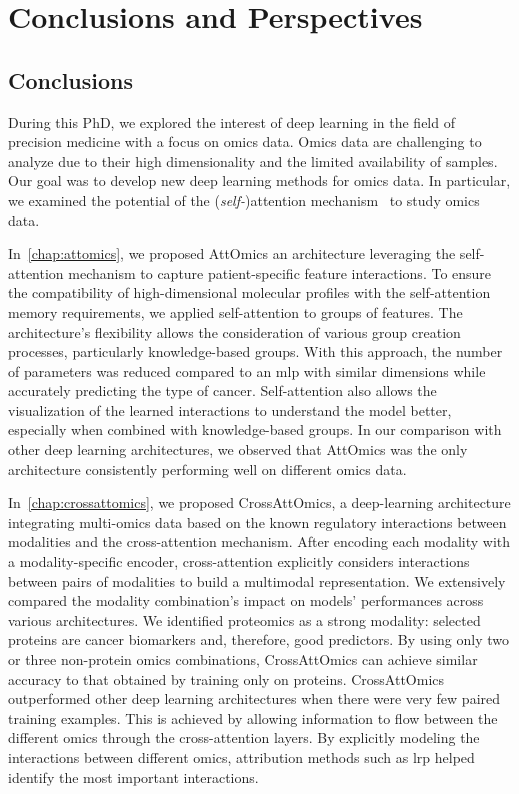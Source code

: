 \documentclass[../main.tex]{subfiles}
\begin{document}
\chapter{Conclusions and Perspectives}
\minitocpage
\section{Conclusions}
	During this PhD, we explored the interest of deep learning in the field of precision medicine with a focus on omics data.
	Omics data are challenging to analyze due to their high dimensionality and the limited availability of samples.
	Our goal was to develop new deep learning methods for omics data.
	In particular, we examined the potential of the (\emph{self-})attention mechanism~\cite{AttentionAllYouNeed} to study omics data.

	In~\cref{chap:attomics}, we proposed AttOmics an architecture leveraging the self-attention mechanism to capture patient-specific feature interactions.
	To ensure the compatibility of high-dimensional molecular profiles with the self-attention memory requirements, we applied self-attention to groups of features.
	The architecture's flexibility allows the consideration of various group creation processes, particularly knowledge-based groups.
	With this approach, the number of parameters was reduced compared to an \gls{mlp} with similar dimensions while accurately predicting the type of cancer.
	Self-attention also allows the visualization of the learned interactions to understand the model better, especially when combined with knowledge-based groups.
	In our comparison with other deep learning architectures, we observed that AttOmics was the only architecture consistently performing well on different omics data.

	In~\cref{chap:crossattomics}, we proposed CrossAttOmics, a deep-learning architecture integrating multi-omics data based on the known regulatory interactions between modalities and the cross-attention mechanism.
	After encoding each modality with a modality-specific encoder, cross-attention explicitly considers interactions between pairs of modalities to build a multimodal representation.
	We extensively compared the modality combination's impact on models' performances across various architectures.
	We identified proteomics as a strong modality: selected proteins are cancer biomarkers and, therefore, good predictors.
	By using only two or three non-protein omics combinations, CrossAttOmics can achieve similar accuracy to that obtained by training only on proteins.
	CrossAttOmics outperformed other deep learning architectures when there were very few paired training examples.
	This is achieved by allowing information to flow between the different omics through the cross-attention layers.
	By explicitly modeling the interactions between different omics, attribution methods such as \gls{lrp} helped identify the most important interactions.
\end{document}
